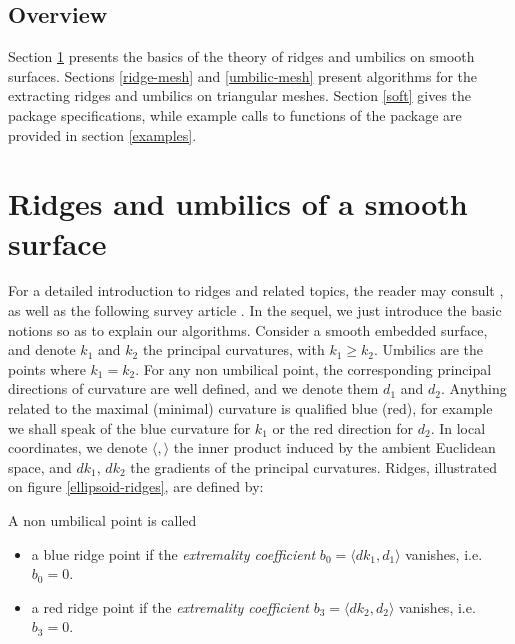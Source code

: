 \subsection{Overview}

Section \ref{smooth} presents the basics of the theory of ridges and
umbilics on smooth surfaces. Sections \ref{ridge-mesh} and
\ref{umbilic-mesh} present algorithms for the extracting ridges and
umbilics on triangular meshes. Section
\ref{soft} gives the package specifications, while example calls to
functions of the package are provided in section \ref{examples}.


\section{Ridges and umbilics of a smooth surface}
\label{smooth}

For a detailed introduction to ridges and related topics, the reader
may consult 
\cite{cgal:hgygm-ttdpf-99,cgal:p-gd-01}, as well as
the following survey article \cite{cgal:cp-ssulc-05}.
In the sequel, we just introduce the basic notions so as to explain
our algorithms.  Consider a smooth embedded surface, and denote $k_1$
and $k_2$ the principal curvatures, with $k_1\geq k_2$. Umbilics are
the points where $k_1=k_2$.  For any non umbilical point, the
corresponding principal directions of curvature are well defined, and
we denote them $d_1$ and $d_2$.
Anything related to the maximal (minimal) curvature is qualified blue
(red), for example we shall speak of the blue curvature for $k_1$ or
the red direction for $d_2$.
In local coordinates, we denote $\langle , \rangle$ the inner product
induced by the ambient Euclidean space, and $dk_1$, $dk_2$ the
gradients of the principal curvatures. Ridges, illustrated on figure
\ref{ellipsoid-ridges}, are defined by:

\begin{definition}
\label{def:ridge-extrema}
A non umbilical point is called
\begin{itemize}
\item
a blue ridge point if the {\em extremality coefficient} $b_0=\langle
dk_1,d_1 \rangle$ vanishes, i.e. $b_0=0$.

\item
a red ridge point if the {\em extremality coefficient} $b_3=\langle
dk_2,d_2 \rangle$ vanishes, i.e. $b_3=0$.

\end{itemize}
\end{definition}

